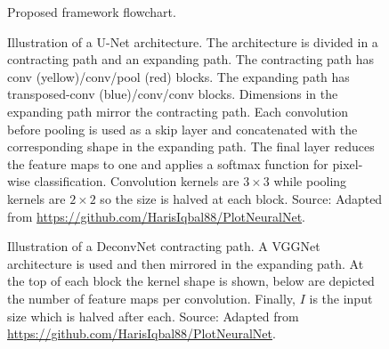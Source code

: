 \begin{figure}
    \centering
    \caption[Proposed framework flowchart]{Proposed framework flowchart.}
    \label{fig:flowchart}
\end{figure}

\begin{figure}
    \centering
    \resizebox{\linewidth}{!}{
    
    }
    \caption[Illustration of a U-Net architecture]{Illustration of a U-Net architecture. The architecture is divided in a contracting path and an expanding path. The contracting path has conv (yellow)/conv/pool (red) blocks. The expanding path has transposed-conv (blue)/conv/conv blocks. Dimensions in the expanding path mirror the contracting path. Each convolution before pooling is used as a skip layer and concatenated with the corresponding shape in the expanding path. The final layer reduces the feature maps to one and applies a softmax function for pixel-wise classification. Convolution kernels are $3\times 3$ while pooling kernels are $2\times 2$ so the size is halved at each block. Source: Adapted from \url{https://github.com/HarisIqbal88/PlotNeuralNet}.}
    \label{fig:unet}
\end{figure}

\begin{figure}
    \centering
    \resizebox{\linewidth}{!}{
    
    }
    \caption[Illustration of a DeconvNet contracting path]{Illustration of a DeconvNet contracting path. A VGGNet architecture is used and then mirrored in the expanding path. At the top of each block the kernel shape is shown, below are depicted the number of feature maps per convolution. Finally, $I$ is the input size which is halved after each. Source: Adapted from \url{https://github.com/HarisIqbal88/PlotNeuralNet}.}
    \label{fig:deconv}
\end{figure}
    
